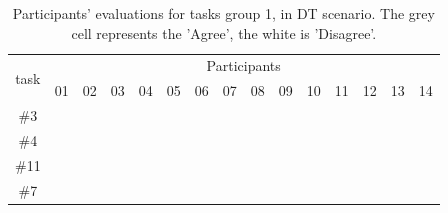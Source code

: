 \begin{itemize}
\begin{table}[t]
\centering
\setlength{\extrarowheight}{0pt}
\addtolength{\extrarowheight}{\aboverulesep}
\addtolength{\extrarowheight}{\belowrulesep}
\setlength{\aboverulesep}{0pt}
\setlength{\belowrulesep}{0pt}
\begin{tabular}{c|rrrrrrrrrrrrrr} 
\toprule
\multirow{2}{*}{task} & \multicolumn{14}{c}{Participants} \\ 
\cmidrule{2-15}
 & 01 & 02 & 03 & 04 & 05 & 06 & 07 & 08 & 09 & 10 & 11 & 12 & 13 & 14 \\ 
\hline
\#3 & {\cellcolor[rgb]{0.502,0.502,0.502}} & {\cellcolor[rgb]{0.502,0.502,0.502}} & {\cellcolor[rgb]{0.502,0.502,0.502}} & {\cellcolor[rgb]{0.502,0.502,0.502}} & {\cellcolor[rgb]{0.502,0.502,0.502}} & {\cellcolor[rgb]{0.502,0.502,0.502}} & {\cellcolor[rgb]{0.502,0.502,0.502}} & {\cellcolor[rgb]{0.502,0.502,0.502}} & {\cellcolor[rgb]{0.502,0.502,0.502}} &  & {\cellcolor[rgb]{0.502,0.502,0.502}} & {\cellcolor[rgb]{0.502,0.502,0.502}} & {\cellcolor[rgb]{0.502,0.502,0.502}} & {\cellcolor[rgb]{0.502,0.502,0.502}} \\
\#4 &  & {\cellcolor[rgb]{0.502,0.502,0.502}} & {\cellcolor[rgb]{0.502,0.502,0.502}} & {\cellcolor[rgb]{0.502,0.502,0.502}} & {\cellcolor[rgb]{0.502,0.502,0.502}} & {\cellcolor[rgb]{0.502,0.502,0.502}} & {\cellcolor[rgb]{0.502,0.502,0.502}} & {\cellcolor[rgb]{0.502,0.502,0.502}} & {\cellcolor[rgb]{0.502,0.502,0.502}} & {\cellcolor[rgb]{0.502,0.502,0.502}} & {\cellcolor[rgb]{0.502,0.502,0.502}} & {\cellcolor[rgb]{0.502,0.502,0.502}} & {\cellcolor[rgb]{0.502,0.502,0.502}} & {\cellcolor[rgb]{0.502,0.502,0.502}} \\
\#11 & {\cellcolor[rgb]{0.502,0.502,0.502}} & {\cellcolor[rgb]{0.502,0.502,0.502}} & {\cellcolor[rgb]{0.502,0.502,0.502}} & {\cellcolor[rgb]{0.502,0.502,0.502}} & {\cellcolor[rgb]{0.502,0.502,0.502}} & {\cellcolor[rgb]{0.502,0.502,0.502}} & {\cellcolor[rgb]{0.502,0.502,0.502}} & {\cellcolor[rgb]{0.502,0.502,0.502}} & {\cellcolor[rgb]{0.502,0.502,0.502}} & {\cellcolor[rgb]{0.502,0.502,0.502}} & {\cellcolor[rgb]{0.502,0.502,0.502}} & {\cellcolor[rgb]{0.502,0.502,0.502}} & {\cellcolor[rgb]{0.502,0.502,0.502}} & {\cellcolor[rgb]{0.502,0.502,0.502}} \\
\#7 & {\cellcolor[rgb]{0.502,0.502,0.502}} & {\cellcolor[rgb]{0.502,0.502,0.502}} &  &  & {\cellcolor[rgb]{0.502,0.502,0.502}} &  &  & {\cellcolor[rgb]{0.502,0.502,0.502}} &  & {\cellcolor[rgb]{0.502,0.502,0.502}} & {\cellcolor[rgb]{0.502,0.502,0.502}} & {\cellcolor[rgb]{0.502,0.502,0.502}} & {\cellcolor[rgb]{0.502,0.502,0.502}} & {\cellcolor[rgb]{0.502,0.502,0.502}} \\
\bottomrule
\end{tabular}
\caption{Participants’ evaluations for tasks group 1, in DT scenario. The grey cell represents the 'Agree', the white is 'Disagree'.}
\label{tbl:participantsEvaluations}
\end{table}
    

\end{itemize}
